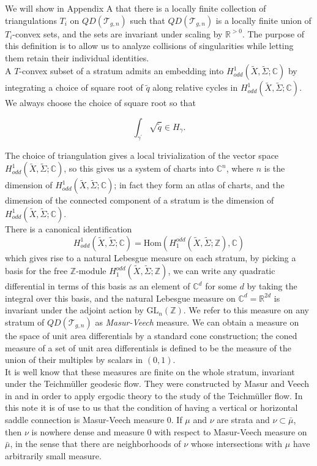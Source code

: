\documentclass[12pt]{article}
\newcommand{\zz}{\mathbb{Z}}
\newcommand{\rr}{\mathbb{R}}
\newcommand{\cc}{\mathbb{C}}
\begin{document}
\noindent We will show in Appendix A that there is a locally finite collection of triangulations $T_i$ on $QD(\mathcal{T}_{g,n})$ such that $QD(\mathcal{T}_{g,n})$ is a locally finite union of $T_i$-convex sets, and the sets are invariant under scaling by $\rr^{>0}$. The purpose of this definition is to allow us to analyze collisions of singularities while letting them retain their individual identities.\\

\noindent A $T$-convex subset of a stratum admits an embedding into $H_{odd}^1(\tilde{X},\tilde{\Sigma}; \cc)$ by integrating a choice of square root of $\tilde{q}$ along relative cycles in $H_{odd}^1(\tilde{X},\tilde{\Sigma}; \cc).$ We always choose the choice of square root so that 

$$\int_{\gamma^\prime}\sqrt{\tilde{q}} \in H_\gamma.$$

\noindent The choice of triangulation gives a local trivialization of the vector space $H_{odd}^1(\tilde{X},\tilde{\Sigma};\cc)$, so this gives us a system of charts into $\cc^n$, where $n$ is the dimension of $H_{odd}^1(\tilde{X},\tilde{\Sigma};\cc)$; in fact they form an atlas of charts, and the dimension of the connected component of a stratum is the dimension of $H_{odd}^1(\tilde{X},\tilde{\Sigma};\cc)$.\\

\noindent There is a canonical identification $$H_{odd}^1(\tilde{X},\tilde{\Sigma};\cc) = \mathrm{Hom}(H_1^{odd}(\tilde{X},\tilde{\Sigma};\zz),\cc)$$ which gives rise to a natural Lebesgue measure on each stratum, by picking a basis for the free $\zz$-module $H_1^{odd}(\tilde{X},\tilde{\Sigma};\zz)$, we can write any quadratic differential in terms of this basis as an element of $\cc^d$ for some $d$ by taking the integral over this basis, and the natural Lebesgue measure on $\cc^d = \rr^{2d}$ is invariant under the adjoint action by $\mathrm{GL}_n(\zz)$. We refer to this measure on any stratum of $QD(\mathcal{T}_{g,n})$ as \emph{Masur-Veech} measure. We can obtain a measure on the space of unit area differentials by a standard cone construction; the coned measure of a set of unit area differentials is defined to be the measure of the union of their multiples by scalars in $(0,1)$.\\

\noindent It is well know that these measures are finite on the whole stratum, invariant under the Teichm\"uller geodesic flow. They were constructed by Masur and Veech in \cite{ietsandmfs} and \cite{Ve86} in order to apply ergodic theory to the study of the Teichm\"uller flow. In this note it is of use to us that the condition of having a vertical or horizontal saddle connection is Masur-Veech measure $0$. If $\mu$ and $\nu$ are strata and $\nu \subset \bar{\mu}$, then $\nu$ is nowhere dense and measure $0$ with respect to Masur-Veech measure on $\bar{\mu}$, in the sense that there are neighborhoods of $\nu$ whose intersections with $\mu$ have arbitrarily small measure.
\end{document}
